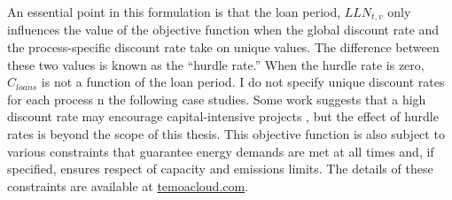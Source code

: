 An essential point in this formulation is that the loan period, $LLN_{t,v}$ only
influences the value of the objective function when the global discount rate
and the process-specific discount rate take on unique values. The difference between
these two values is known as the ``hurdle rate.'' When the hurdle rate is zero,
$C_{loans}$ is not a function of the loan period. I
do not specify unique discount rates for each process n the following case studies.
Some work suggests that a high discount rate may encourage capital-intensive projects \cite{alzbutas_uncertainty_2012,
decarolis_modelling_2016}, but the effect of hurdle rates is beyond the scope of
this thesis. This objective function is also subject to various constraints that
guarantee energy demands are met at all times and, if specified, ensures respect
of capacity and emissions limits. The details of these constraints are available
at \href{https://temoacloud.com/temoaproject/Documentation.html#the-math-behind-temoa}{temoacloud.com}.

